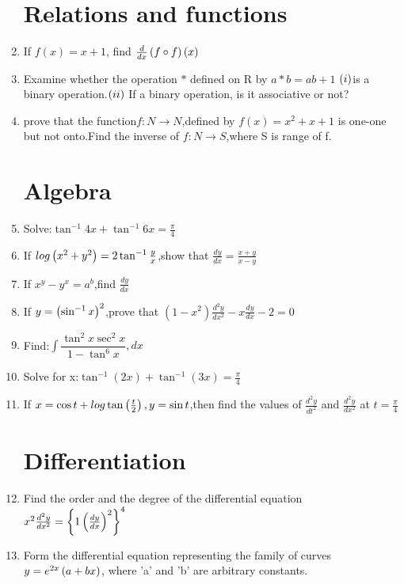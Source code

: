 \documentclass{article}
\begin{document}
\begin{enumerate}
\section{Relations and functions}
           \item If $f(x) = x + 1$, find $\frac{d}{dx}\left(f \circ f\right)\left(x\right)$
	   \item Examine whether the operation $*$ defined on R by $a * b = ab + 1$ $\left(i\right)$is a binary operation.$\left(ii\right)$ If a binary operation, is it associative or not?
            \item prove that the function$f:N \rightarrow N$,defined by $f(x)=x^2+x+1$ is one-one but not onto.Find the inverse of $f:N\rightarrow S$,where S is range of f.
            \section{Algebra}
\item Solve:$\tan^{-1}4x+\tan^{-1}6x=\frac{\pi}{4}$
\item If $log\left(x^2+y^2\right)=2\tan^{-1}\frac{y}{x}$,show that $\frac{dy}{dx}=\frac{x+y}{x-y}$
\item If $x^y-y^x=a^b$,find $\frac{dy}{dx}$
\item If $y=\left(\sin^{-1}x\right)^2$,prove that $(1-x^2)\frac{d^2y}{dx^2}-x\frac{dy}{dx}-2=0$
\item Find:$\int\dfrac{\tan^2x\sec^2x}{1-\tan^6x},dx$
\item Solve for x:$\tan^{-1}(2x)+\tan^{-1}(3x)=\frac{\pi}{4}$
\item If $x=\cos t+log \tan\left(\frac{t}{2}\right),y=\sin t$,then find the values of $\frac{d^2y}{dt^2}$ and $\frac{d^2y}{dx^2}$ at $t=\frac{\pi}{4}$
\section{Differentiation}
	\item Find the order and the degree of the differential equation $x^2\frac{d^2y}{dx^2}=\left\{1\left(\frac{dy}{dx}\right)^2\right\}^4$ 
        \item Form the differential equation representing the family of curves $y = e^{2x}\left(a + bx\right)$, where 'a' and 'b' are arbitrary constants.

\end{enumerate}
\end{document}
